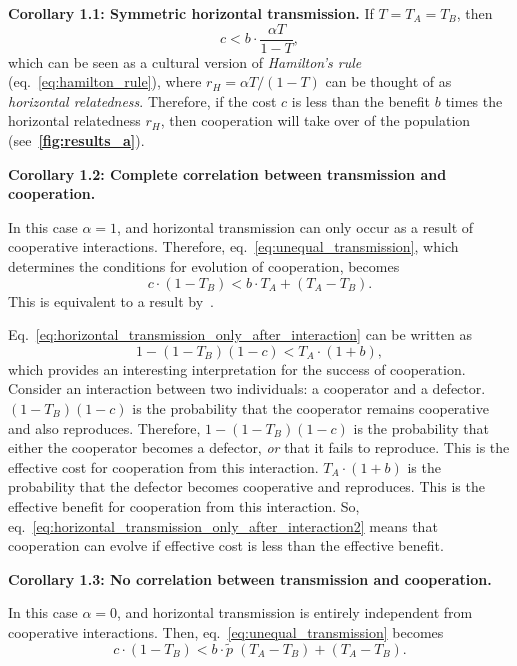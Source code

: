 \documentclass[12pt]{extarticle}
\begin{document}
\textbf{Corollary 1.1: Symmetric horizontal transmission.}
If $T=T_A=T_B$, then
\begin{equation}
\label{eq:equal_transmission}
c < b \cdot \frac{\alpha T}{1-T},
\end{equation}
which can be seen as a cultural version of \emph{Hamilton's rule} (eq.~\ref{eq:hamilton_rule}), where $r_H=\alpha T/(1-T)$ can be thought of as \emph{horizontal relatedness}.
Therefore, if the cost $c$ is less than the benefit $b$ times the horizontal relatedness $r_H$, then cooperation will take over of the population (see~\textbf{\autoref{fig:results_a}}).

\textbf{Corollary 1.2: Complete correlation between transmission and cooperation.}
	
In this case $\alpha=1$, and horizontal transmission can only occur as a result of cooperative interactions.
Therefore, eq.~\ref{eq:unequal_transmission}, which determines the conditions for evolution of cooperation, becomes
\begin{equation}\label{eq:horizontal_transmission_only_after_interaction}
c \cdot (1-T_B) < b \cdot T_A + (T_A - T_B).
\end{equation}
This is equivalent to a result by~\citet[eq.~1]{lewin2017microbes}.

Eq.~\ref{eq:horizontal_transmission_only_after_interaction} can be written as
\begin{equation} \label{eq:horizontal_transmission_only_after_interaction2}
1 - (1-T_B)(1-c) < T_A \cdot (1+b) ,
\end{equation}
which provides an interesting interpretation for the success of cooperation. 
Consider an interaction between two individuals: a cooperator and a defector.
$(1-T_B)(1-c)$ is the probability that the cooperator remains cooperative and also reproduces. 
Therefore, $1 - (1-T_B)(1-c)$ is the probability that either the cooperator becomes a defector, \emph{or} that it fails to reproduce.
This is the effective cost for cooperation from this interaction.
$T_A\cdot(1+b)$ is the probability that the defector becomes cooperative and reproduces.
This is the effective benefit for cooperation from this interaction.
So, eq.~\ref{eq:horizontal_transmission_only_after_interaction2} means that cooperation can evolve if effective cost is less than the effective benefit.

\textbf{Corollary 1.3: No correlation between transmission and cooperation.}

In this case $\alpha=0$, and horizontal transmission is entirely independent from cooperative interactions.  
Then, eq.~\ref{eq:unequal_transmission} becomes
\begin{equation} \label{eq:horizontal_transmission_from_population}
c\cdot(1-T_B) < b \cdot \tilde{p} \;(T_A-T_B) + (T_A-T_B). 
\end{equation}
\end{document}

